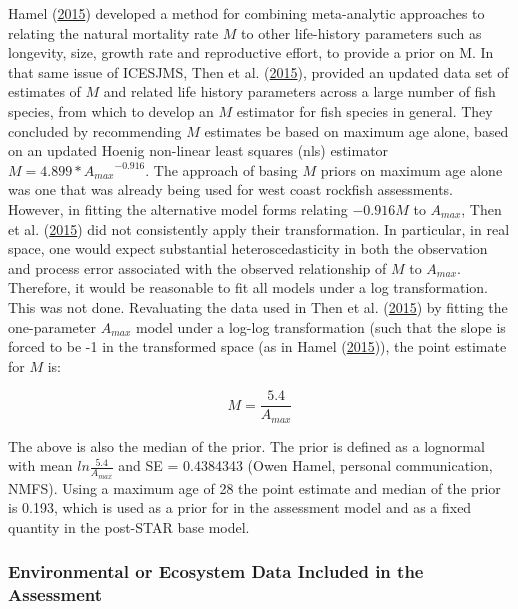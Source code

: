 \documentclass[12pt,]{article}
\begin{document}
Hamel (\protect\hyperlink{ref-Hamel2015}{2015}) developed a method for
combining meta-analytic approaches to relating the natural mortality
rate \(M\) to other life-history parameters such as longevity, size,
growth rate and reproductive effort, to provide a prior on M. In that
same issue of ICESJMS, Then et al.
(\protect\hyperlink{ref-Then2015}{2015}), provided an updated data set
of estimates of \(M\) and related life history parameters across a large
number of fish species, from which to develop an \(M\) estimator for
fish species in general. They concluded by recommending \(M\) estimates
be based on maximum age alone, based on an updated Hoenig non-linear
least squares (nls) estimator \(M= 4.899*{A_{max}}^{-0.916}\). The
approach of basing \(M\) priors on maximum age alone was one that was
already being used for west coast rockfish assessments. However, in
fitting the alternative model forms relating \(-0.916M\) to \(A_{max}\),
Then et al. (\protect\hyperlink{ref-Then2015}{2015}) did not
consistently apply their transformation. In particular, in real space,
one would expect substantial heteroscedasticity in both the observation
and process error associated with the observed relationship of \(M\) to
\(A_{max}\). Therefore, it would be reasonable to fit all models under a
log transformation. This was not done. Revaluating the data used in Then
et al. (\protect\hyperlink{ref-Then2015}{2015}) by fitting the
one-parameter \(A_{max}\) model under a log-log transformation (such
that the slope is forced to be -1 in the transformed space (as in Hamel
(\protect\hyperlink{ref-Hamel2015}{2015})), the point estimate for \(M\)
is:

\begin{equation}
M = \frac{5.4}{A_{max}}
\end{equation}

The above is also the median of the prior. The prior is defined as a
lognormal with mean \(ln\frac{5.4}{A_{max}}\) and SE = 0.4384343 (Owen
Hamel, personal communication, NMFS). Using a maximum age of 28 the
point estimate and median of the prior is 0.193, which is used as a
prior for in the assessment model and as a fixed quantity in the
post-STAR base model.

\vspace{.5cm}

\subsubsection{Environmental or Ecosystem Data Included in the
Assessment}\label{environmental-or-ecosystem-data-included-in-the-assessment}
\end{document}
